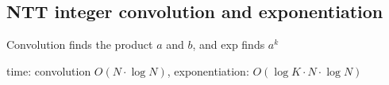 \subsection{NTT integer convolution and exponentiation}

Convolution finds the product $a$ and $b$, and exp finds $a^{k}$

time: convolution $O(N \cdot \log{N})$, exponentiation: $O(\log{K} \cdot N \cdot \log{N})$
